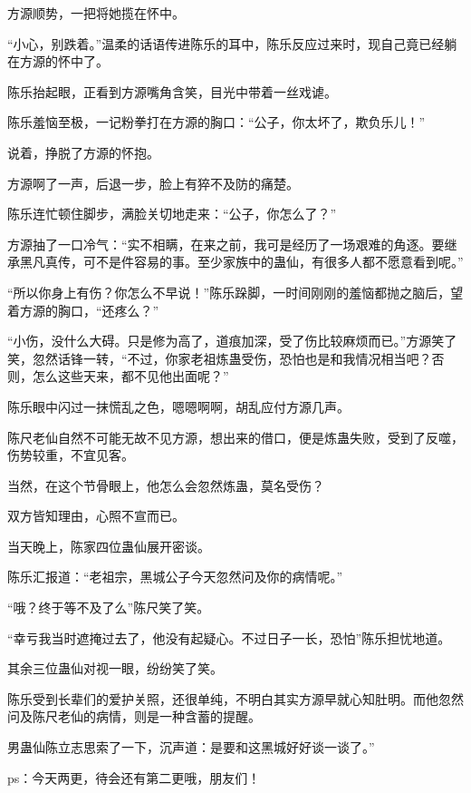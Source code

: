 \begin{this_body}
方源顺势，一把将她揽在怀中。

“小心，别跌着。”温柔的话语传进陈乐的耳中，陈乐反应过来时，现自己竟已经躺在方源的怀中了。

陈乐抬起眼，正看到方源嘴角含笑，目光中带着一丝戏谑。

陈乐羞恼至极，一记粉拳打在方源的胸口：“公子，你太坏了，欺负乐儿！”

说着，挣脱了方源的怀抱。

方源啊了一声，后退一步，脸上有猝不及防的痛楚。

陈乐连忙顿住脚步，满脸关切地走来：“公子，你怎么了？”

方源抽了一口冷气：“实不相瞒，在来之前，我可是经历了一场艰难的角逐。要继承黑凡真传，可不是件容易的事。至少家族中的蛊仙，有很多人都不愿意看到呢。”

“所以你身上有伤？你怎么不早说！”陈乐跺脚，一时间刚刚的羞恼都抛之脑后，望着方源的胸口，“还疼么？”

“小伤，没什么大碍。只是修为高了，道痕加深，受了伤比较麻烦而已。”方源笑了笑，忽然话锋一转，“不过，你家老祖炼蛊受伤，恐怕也是和我情况相当吧？否则，怎么这些天来，都不见他出面呢？”

陈乐眼中闪过一抹慌乱之色，嗯嗯啊啊，胡乱应付方源几声。

陈尺老仙自然不可能无故不见方源，想出来的借口，便是炼蛊失败，受到了反噬，伤势较重，不宜见客。

当然，在这个节骨眼上，他怎么会忽然炼蛊，莫名受伤？

双方皆知理由，心照不宣而已。

当天晚上，陈家四位蛊仙展开密谈。

陈乐汇报道：“老祖宗，黑城公子今天忽然问及你的病情呢。”

“哦？终于等不及了么”陈尺笑了笑。

“幸亏我当时遮掩过去了，他没有起疑心。不过日子一长，恐怕”陈乐担忧地道。

其余三位蛊仙对视一眼，纷纷笑了笑。

陈乐受到长辈们的爱护关照，还很单纯，不明白其实方源早就心知肚明。而他忽然问及陈尺老仙的病情，则是一种含蓄的提醒。

男蛊仙陈立志思索了一下，沉声道：是要和这黑城好好谈一谈了。”

ps：今天两更，待会还有第二更哦，朋友们！

\end{this_body}

